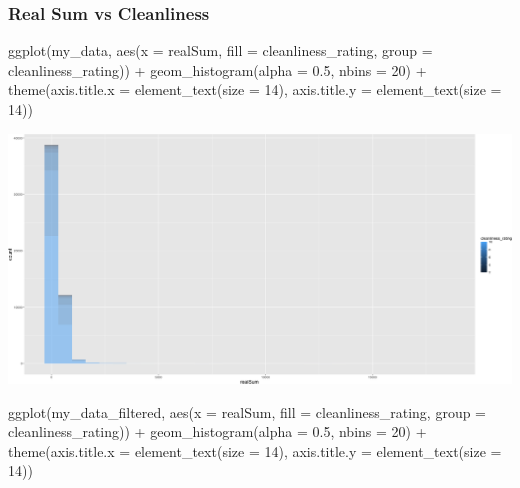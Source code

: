 \documentclass[
]{article}
\newenvironment{Shaded}{\begin{snugshade}}{\end{snugshade}}
\newcommand{\AttributeTok}[1]{\textcolor[rgb]{0.77,0.63,0.00}{#1}}
\newcommand{\DecValTok}[1]{\textcolor[rgb]{0.00,0.00,0.81}{#1}}
\newcommand{\FloatTok}[1]{\textcolor[rgb]{0.00,0.00,0.81}{#1}}
\newcommand{\FunctionTok}[1]{\textcolor[rgb]{0.00,0.00,0.00}{#1}}
\newcommand{\NormalTok}[1]{#1}
\newcommand{\SpecialCharTok}[1]{\textcolor[rgb]{0.00,0.00,0.00}{#1}}
\begin{document}
\hypertarget{real-sum-vs-cleanliness}{%
\subsubsection{Real Sum vs Cleanliness}\label{real-sum-vs-cleanliness}}

\begin{Shaded}
\begin{Highlighting}[]
\FunctionTok{ggplot}\NormalTok{(my\_data, }\FunctionTok{aes}\NormalTok{(}\AttributeTok{x =}\NormalTok{ realSum, }\AttributeTok{fill =}\NormalTok{ cleanliness\_rating, }\AttributeTok{group =}\NormalTok{ cleanliness\_rating)) }\SpecialCharTok{+}
    \FunctionTok{geom\_histogram}\NormalTok{(}\AttributeTok{alpha =} \FloatTok{0.5}\NormalTok{, }\AttributeTok{nbins =} \DecValTok{20}\NormalTok{) }\SpecialCharTok{+} \FunctionTok{theme}\NormalTok{(}\AttributeTok{axis.title.x =} \FunctionTok{element\_text}\NormalTok{(}\AttributeTok{size =} \DecValTok{14}\NormalTok{),}
    \AttributeTok{axis.title.y =} \FunctionTok{element\_text}\NormalTok{(}\AttributeTok{size =} \DecValTok{14}\NormalTok{))}
\end{Highlighting}
\end{Shaded}

\includegraphics{Project_files/figure-latex/unnamed-chunk-23-1.png}

\begin{Shaded}
\begin{Highlighting}[]
\FunctionTok{ggplot}\NormalTok{(my\_data\_filtered, }\FunctionTok{aes}\NormalTok{(}\AttributeTok{x =}\NormalTok{ realSum, }\AttributeTok{fill =}\NormalTok{ cleanliness\_rating,}
    \AttributeTok{group =}\NormalTok{ cleanliness\_rating)) }\SpecialCharTok{+} \FunctionTok{geom\_histogram}\NormalTok{(}\AttributeTok{alpha =} \FloatTok{0.5}\NormalTok{,}
    \AttributeTok{nbins =} \DecValTok{20}\NormalTok{) }\SpecialCharTok{+} \FunctionTok{theme}\NormalTok{(}\AttributeTok{axis.title.x =} \FunctionTok{element\_text}\NormalTok{(}\AttributeTok{size =} \DecValTok{14}\NormalTok{),}
    \AttributeTok{axis.title.y =} \FunctionTok{element\_text}\NormalTok{(}\AttributeTok{size =} \DecValTok{14}\NormalTok{))}
\end{Highlighting}
\end{Shaded}
\end{document}
